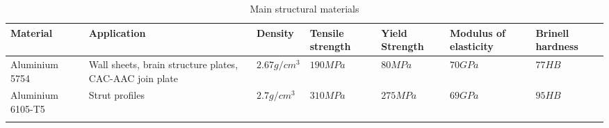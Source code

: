 


\begin{longtable}{|m{}| m{} |m{} |m{}|m{}| m{} | m{}|}
\hline
\textbf{Material} & \textbf{Application} & \textbf{Density} & \textbf{Tensile strength} & \textbf{Yield Strength} & \textbf{Modulus of elasticity}  & \textbf{Brinell hardness} \\ \hline 
Aluminium 5754 & Wall sheets,  brain structure plates, CAC-AAC join plate & $2.67 g/cm^3$ & $190 MPa$ & $80 MPa$ & $70 GPa$ & $77 HB$ \\ \hline
Aluminium 6105-T5 & Strut profiles & $2.7g/cm^3$ & $310 MPa$ & $275MPa$ & $69 GPa$ & $95HB$ \\ \hline

\caption{Main structural materials}
\label{table:materials_prop}
\end{longtable}



